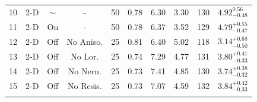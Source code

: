 \begin{table}[]
\begin{tabular}{cccccccccc}
        10  & 2-D  & $\sim$ & -         & 50                                                                & 0.78                                                            & 6.30                                                                  & 3.30                                                             & 130                                                       & $4.92_{-0.48}^{0.56}$  \\
        11  & 2-D  & On     & -         & 50                                                                & 0.78                                                            & 6.37                                                                  & 3.52                                                             & 129                                                       & $4.79_{-0.47}^{+0.55}$ \\
        12  & 2-D  & Off    & No Aniso. & 25                                                                & 0.81                                                            & 6.40                                                                  & 5.02                                                             & 118                                                       & $3.14_{-0.50}^{+0.68}$ \\
        13  & 2-D  & Off    & No Lor.   & 25                                                                & 0.74                                                            & 7.29                                                                  & 4.77                                                             & 131                                                       & $3.80_{-0.33}^{+0.41}$ \\
        14  & 2-D  & Off    & No Nern.  & 25                                                                & 0.73                                                            & 7.41                                                                  & 4.85                                                             & 130                                                       & $3.74_{-0.32}^{+0.38}$ \\
        15  & 2-D  & Off    & No Resis. & 25                                                                & 0.73                                                            & 7.07                                                                  & 4.59                                                             & 132                                                       & $3.84_{-0.33}^{+0.42}$ \\ \hhline{==========}
\end{tabular}
\end{table}
\egroup%

